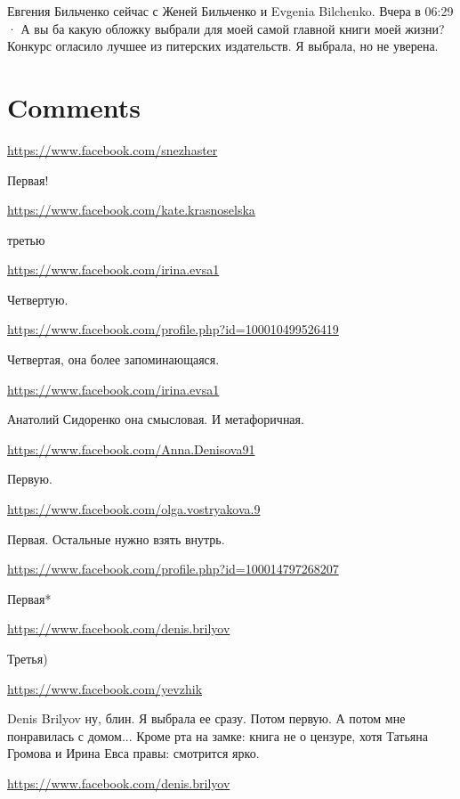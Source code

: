 \documentclass[a4paper,11pt]{extreport}
\begin{document}
Евгения Бильченко сейчас с Женей Бильченко и Evgenia Bilchenko.
Вчера в 06:29 ·
А вы ба какую обложку выбрали для моей самой главной книги моей жизни? Конкурс огласило лучшее из питерских издательств. Я выбрала, но не уверена.
\section{Comments}
\begin{itemize}
\url{https://www.facebook.com/snezhaster}

Первая!

\url{https://www.facebook.com/kate.krasnoselska}

третью

\url{https://www.facebook.com/irina.evsa1}

Четвертую.

\url{https://www.facebook.com/profile.php?id=100010499526419}

Четвертая, она более запоминающаяся.

\begin{itemize}
\url{https://www.facebook.com/irina.evsa1}

Анатолий Сидоренко она смысловая. И метафоричная.

\end{itemize}
\url{https://www.facebook.com/Anna.Denisova91}

Первую.

\url{https://www.facebook.com/olga.vostryakova.9}

Первая. Остальные нужно взять внутрь.

\url{https://www.facebook.com/profile.php?id=100014797268207}

Первая*

\url{https://www.facebook.com/denis.brilyov}

Третья)

\begin{itemize}
\url{https://www.facebook.com/yevzhik}

Denis Brilyov ну, блин. Я выбрала ее сразу. Потом первую. А потом мне понравилась с домом... Кроме рта на замке: книга не о цензуре, хотя Татьяна Громова и Ирина Евса правы: смотрится ярко.

\url{https://www.facebook.com/denis.brilyov}


\end{itemize}
\end{itemize}
\end{document}
